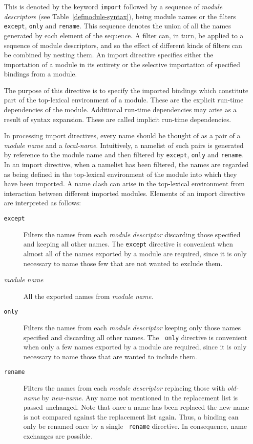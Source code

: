\begin{optDefinition}
This is denoted by the keyword {\tt import} followed by a sequence of
{\em module descriptor}s (see Table~\ref{defmodule-syntax}), being module names
or the filters {\tt except}, {\tt only} and {\tt rename}.  This sequence denotes
the union of all the names generated by each element of the sequence.  A filter
can, in turn, be applied to a sequence of module descriptors, and so the effect
of different kinds of filters can be combined by nesting them.  An import
directive specifies either the importation of a module in its entirety or the
selective importation of specified bindings from a module.

The purpose of this directive is to specify the imported bindings which
constitute part of the top-lexical environment of a module.  These are the
explicit run-time dependencies of the module.  Additional run-time dependencies
may arise as a result of syntax expansion.  These are called implicit run-time
dependencies.

In processing import directives, every name should be thought of as a pair of a
{\em module name} and a {\em local-name}.  Intuitively, a namelist of such pairs
is generated by reference to the module name and then filtered by {\tt except},
{\tt only} and {\tt rename}.  In an import directive, when a namelist has been
filtered, the names are regarded as being defined in the top-lexical environment
of the module into which they have been imported.  A name clash can arise in the
top-lexical environment from interaction between different imported modules.
Elements of an import directive are interpreted as follows:
%
\begin{description}
    \item[{\tt except}] Filters the names from each {\em module descriptor}
    discarding those specified and keeping all other names.  The {\tt except}
    directive is convenient when almost all of the names exported by a module
    are required, since it is only necessary to name those few that are not
    wanted to exclude them.

    \item[{\em module name}] All the exported names from {\em module name}.

    \item[{\tt only}] Filters the names from each {\em module descriptor}
    keeping only those names specified and discarding all other names.  The {\tt
        only} directive is convenient when only a few names exported by a module
    are required, since it is only necessary to name those that are wanted to
    include them.

    \item[{\tt rename}] Filters the names from each {\em module descriptor}
    replacing those with {\em old-name} by {\em new-name}.  Any name not
    mentioned in the replacement list is passed unchanged.  Note that once a
    name has been replaced the new-name is not compared against the replacement
    list again.  Thus, a binding can only be renamed once by a single {\tt
        rename} directive.  In consequence, name exchanges are possible.
\end{description}
\end{optDefinition}
